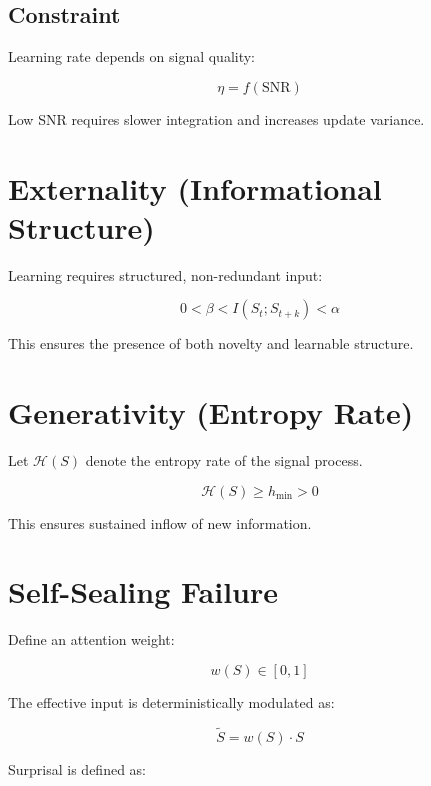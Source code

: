 \documentclass[11pt]{article}
\begin{document}
\subsection*{Constraint}

Learning rate depends on signal quality:

\begin{equation}
\eta = f(\text{SNR})
\end{equation}

Low SNR requires slower integration and increases update variance.

\section{Externality (Informational Structure)}

Learning requires structured, non-redundant input:

\begin{equation}
0 < \beta < I(S_t ; S_{t+k}) < \alpha
\end{equation}

This ensures the presence of both novelty and learnable structure.

\section{Generativity (Entropy Rate)}

Let $\mathcal{H}(S)$ denote the entropy rate of the signal process.

\begin{equation}
\mathcal{H}(S) \ge h_{\min} > 0
\end{equation}

This ensures sustained inflow of new information.

\section{Self-Sealing Failure}

Define an attention weight:

\begin{equation}
w(S) \in [0,1]
\end{equation}

The effective input is deterministically modulated as:

\begin{equation}
\tilde{S} = w(S) \cdot S
\end{equation}

Surprisal is defined as:
\end{document}
